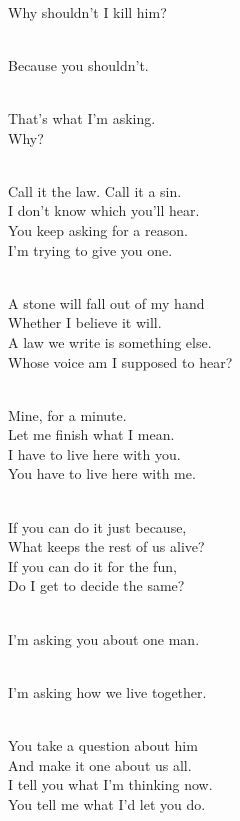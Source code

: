 \begin{lyrics}

\\
Why shouldn’t I kill him?

\\
Because you shouldn’t.

\\
That’s what I’m asking.\\
Why?

\\
Call it the law. Call it a sin.\\
I don’t know which you’ll hear.\\
You keep asking for a reason.\\
I’m trying to give you one.

\\
A stone will fall out of my hand\\
Whether I believe it will.\\
A law we write is something else.\\
Whose voice am I supposed to hear?

\\
Mine, for a minute.\\
Let me finish what I mean.\\
I have to live here with you.\\
You have to live here with me.

\\
If you can do it just because,\\
What keeps the rest of us alive?\\
If you can do it for the fun,\\
Do I get to decide the same?

\\
I’m asking you about one man.

\\
I’m asking how we live together.


\\
You take a question about him\\
And make it one about us all.\\
I tell you what I’m thinking now.\\
You tell me what I’d let you do.


\end{lyrics}
